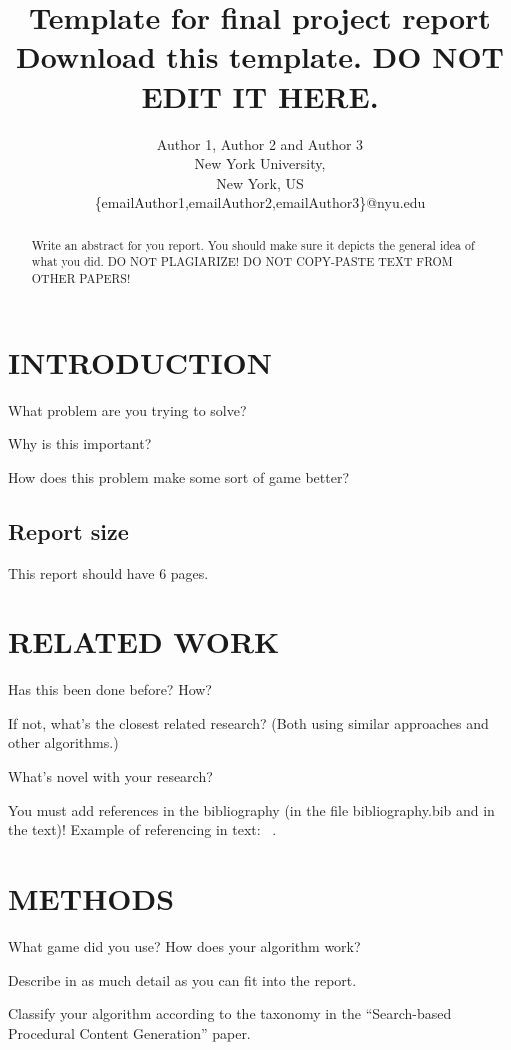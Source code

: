 \documentclass[letterpaper, 10 pt, conference]{ieeeconf}
\title{\LARGE \bf
Template for final project report\\
Download this template. DO NOT EDIT IT HERE.
}
\author{Author 1, Author 2 and Author 3\\
New York University,\\
New York, US\\
\{emailAuthor1,emailAuthor2,emailAuthor3\}@nyu.edu
}
\begin{document}
\maketitle
\thispagestyle{empty}
\pagestyle{empty}


\begin{abstract}

Write an abstract for you report. You should make sure it depicts the general idea of what you did. DO NOT PLAGIARIZE! DO NOT COPY-PASTE TEXT FROM OTHER PAPERS!

\end{abstract}



\section{INTRODUCTION}

What problem are you trying to solve?

Why is this important?

How does this problem make some sort of game better?

\subsection{Report size}

This report should have 6 pages.

\section{RELATED WORK}

Has this been done before? How?

If not, what’s the closest related research? (Both using similar approaches and other algorithms.)

What’s novel with your research?

You must add references in the bibliography (in the file bibliography.bib and in the text)! Example of referencing in text: ~\cite{togelius2007towards}.

\section{METHODS}

What game did you use? How does your algorithm work? 

Describe in as much detail as you can fit into the report. 

Classify your algorithm according to the taxonomy in the “Search-based Procedural Content Generation” paper.
\end{document}
